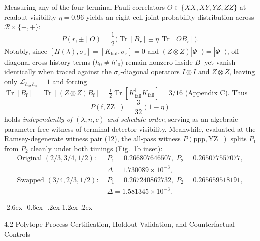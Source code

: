 \documentclass[11pt,letterpaper]{article}
\makeatletter
\renewcommand\subsection{\@startsection{subsection}{2}{\z@}%
  {-2.6ex \@plus -0.6ex \@minus -.2ex}%
  {1.2ex \@plus .2ex}%
  {\normalfont\large\bfseries\raggedright\hyphenpenalty=10000}}
\theoremstyle{definition}
\makeatother
\begin{document}
Measuring any of the four terminal Pauli correlators
\(O \in \{XX, XY, YZ, ZZ\}\) at readout visibility \(\eta = 0.96\)
yields an eight-cell joint probability distribution across
\(\mathcal{R} \times \{-, +\}\):
\[P(r, \pm \mid O) = \frac{1}{2}\Big(\operatorname{Tr}[B_r] \pm \eta\,\operatorname{Tr}[O B_r]\Big).
\tag{20}\] Notably, since
\([H(\lambda), \sigma_z] = [K_{\mathrm{fail}}, \sigma_z] = 0\) and
\((Z\otimes Z)|\Phi^+\rangle = |\Phi^+\rangle\), off-diagonal
cross-history terms (\(h_0 \neq h'_0\)) remain nonzero inside
\(B_{\mathrm{f}}\) yet vanish identically when traced against the
\(\sigma_z\)-diagonal operators \(I\otimes I\) and \(Z\otimes Z\),
leaving only \(\mathcal{L}_{h_0, h_0} = 1\) and forcing
\(\operatorname{Tr}[B_{\mathrm{f}}] = \operatorname{Tr}[(Z\otimes Z) B_{\mathrm{f}}] = \frac{1}{2}\operatorname{Tr}[K_{\mathrm{fail}}^\dagger K_{\mathrm{fail}}] = 3/16\)
(Appendix C). Thus
\[P(\mathrm{f}, \mathrm{ZZ}^-) = \frac{3}{32}(1 - \eta)\] holds
\emph{independently of \((\lambda, n, c)\) and schedule order}, serving
as an algebraic parameter-free witness of terminal detector visibility.
Meanwhile, evaluated at the Ramsey-degenerate witness pair (12), the
all-pass witness \(P(\mathrm{ppp}, \mathrm{YZ}^-)\) splits \(P_1\) from
\(P_2\) cleanly under both timings (Fig.~1b inset): \[\begin{aligned}
\text{Original }(2/3, 3/4, 1/2):\;& P_1 = 0.266807646507,\; P_2 = 0.265077557077, \\
&\Delta = 1.730089 \times 10^{-3}, \\
\text{Swapped }(3/4, 2/3, 1/2):\;& P_1 = 0.267240862732,\; P_2 = 0.265659518191, \\
&\Delta = 1.581345 \times 10^{-3}.
\end{aligned}
\tag{21}\]

\subsection{4.2 Polytope Process Certification, Holdout Validation, and
Counterfactual
Controls}\label{polytope-process-certification-holdout-validation-and-counterfactual-controls}
\end{document}
